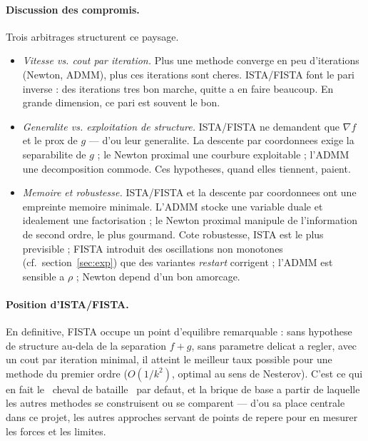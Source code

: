 \paragraph{Discussion des compromis.} Trois arbitrages structurent ce paysage.
\begin{itemize}
  \item \emph{Vitesse vs. cout par iteration.} Plus une methode converge en peu
        d'iterations (Newton, ADMM), plus ces iterations sont cheres. ISTA/FISTA
        font le pari inverse : des iterations tres bon marche, quitte a en faire
        beaucoup. En grande dimension, ce pari est souvent le bon.
  \item \emph{Generalite vs. exploitation de structure.} ISTA/FISTA ne demandent
        que $\nabla f$ et le prox de $g$ --- d'ou leur generalite. La descente
        par coordonnees exige la separabilite de $g$ ; le Newton proximal une
        courbure exploitable ; l'ADMM une decomposition commode. Ces hypotheses,
        quand elles tiennent, paient.
  \item \emph{Memoire et robustesse.} ISTA/FISTA et la descente par coordonnees
        ont une empreinte memoire minimale. L'ADMM stocke une variable duale et
        idealement une factorisation ; le Newton proximal manipule de
        l'information de second ordre, le plus gourmand. Cote robustesse, ISTA
        est le plus previsible ; FISTA introduit des oscillations non monotones
        (cf.~section~\ref{sec:exp}) que des variantes \emph{restart} corrigent ;
        l'ADMM est sensible a $\rho$ ; Newton depend d'un bon amorcage.
\end{itemize}

\paragraph{Position d'ISTA/FISTA.} En definitive, FISTA occupe un point
d'equilibre remarquable : sans hypothese de structure au-dela de la separation
$f + g$, sans parametre delicat a regler, avec un cout par iteration minimal, il
atteint le meilleur taux possible pour une methode du premier ordre
($O(1/k^2)$, optimal au sens de Nesterov). C'est ce qui en fait le \guillemotleft{}~cheval de
bataille~\guillemotright{} par defaut, et la brique de base a partir de laquelle les autres
methodes se construisent ou se comparent --- d'ou sa place centrale dans ce
projet, les autres approches servant de points de repere pour en mesurer les
forces et les limites.
